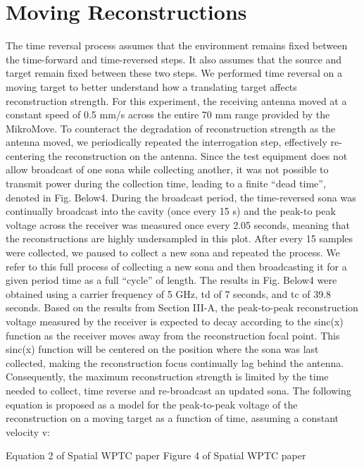 \chapter{Moving Reconstructions}

\label{ch:moving}

The time reversal process assumes that the environment remains fixed between the time-forward and time-reversed steps. It also assumes that the source and target remain fixed between these two steps. We performed time reversal on a moving target to better understand how a translating target affects reconstruction strength.
For this experiment, the receiving antenna moved at a constant speed of 0.5 mm/s across the entire 70 mm range provided by the MikroMove. To counteract the degradation of reconstruction strength as the antenna moved, we periodically repeated the interrogation step, effectively re-centering the reconstruction on the antenna. Since the test equipment does not allow broadcast of one sona while collecting another, it was not possible to transmit power during the collection time, leading to a finite “dead time”, denoted in Fig. {Below}4. During the broadcast period, the time-reversed sona was continually broadcast into the cavity (once every 15 s) and the peak-to peak voltage across the receiver was measured once every 2.05 seconds, meaning that the reconstructions are highly undersampled in this plot. After every 15 samples were collected, we paused to collect a new sona and repeated the process. We refer to this full process of collecting a new sona and then broadcasting it for a given period time as a full “cycle” of length. The results in Fig. {Below}4 were obtained using a carrier frequency of 5 GHz, td of 7 seconds, and tc of 39.8 seconds. Based on the results from Section III-A, the peak-to-peak reconstruction voltage measured by the receiver is expected to decay according to the sinc(x) function as the receiver
moves away from the reconstruction focal point. This sinc(x) function will be centered on the position where the sona was last collected, making the reconstruction focus continually lag behind the antenna. Consequently, the maximum reconstruction strength is limited by the time needed to collect, time reverse and re-broadcast an updated sona. The following equation is proposed as a model for the peak-to-peak voltage of the reconstruction on a moving target as a
function of time, assuming a constant velocity v:

{Equation 2 of Spatial WPTC paper}
{Figure 4 of Spatial WPTC paper}
